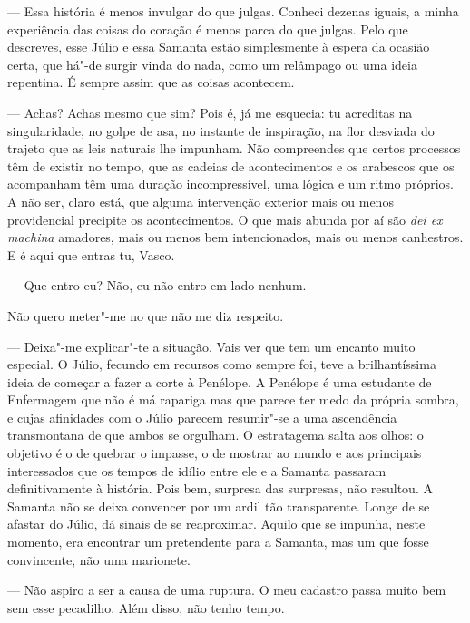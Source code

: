 --- Essa história é menos invulgar do que julgas. Conheci dezenas iguais,
  a minha experiência das coisas do coração é menos parca do que julgas.
  Pelo que descreves, esse Júlio e essa Samanta estão simplesmente à
  espera da ocasião certa, que há"-de surgir vinda do nada, como um relâmpago ou uma ideia repentina. É
sempre assim que as coisas acontecem.

--- Achas? Achas mesmo que sim? Pois é, já me esquecia: tu acreditas na
  singularidade, no golpe de asa, no instante de inspiração, na flor
  desviada do trajeto que as leis naturais lhe impunham. Não
  compreendes que certos processos têm de existir no tempo, que as
  cadeias de acontecimentos e os arabescos que os acompanham têm uma
  duração incompressível, uma lógica e um ritmo próprios. A não ser,
  claro está, que alguma intervenção exterior mais ou menos providencial
  precipite os acontecimentos. O que mais abunda por aí são \emph{dei ex
  machina }amadores, mais ou menos bem intencionados, mais ou menos
  canhestros. E é aqui que entras tu, Vasco.

--- Que entro eu? Não, eu não entro em lado nenhum.

Não quero meter"-me no que não me diz respeito.

--- Deixa"-me explicar"-te a situação. Vais ver que tem um encanto muito
especial. O Júlio, fecundo em recursos como sempre foi, teve a
brilhantíssima ideia de começar a fazer a corte à Penélope. A Penélope
é uma estudante de Enfermagem que não é má rapariga mas que parece ter
medo da própria sombra, e cujas afinidades com o Júlio parecem
resumir"-se a uma ascendência transmontana de que ambos se orgulham. O
estratagema salta aos olhos: o objetivo é o de quebrar o impasse, o
de mostrar ao mundo e aos principais interessados
que os tempos de idílio entre ele e a Samanta passaram definitivamente
à história. Pois bem, surpresa das surpresas, não resultou. A Samanta
não se deixa convencer por um ardil tão transparente. Longe de se
afastar do Júlio, dá sinais de se reaproximar. Aquilo que se impunha,
neste momento, era encontrar um pretendente para a Samanta, mas um que
fosse convincente, não uma marionete.

--- Não aspiro a ser a causa de uma ruptura. O meu cadastro passa muito
  bem sem esse pecadilho. Além disso, não tenho tempo.

